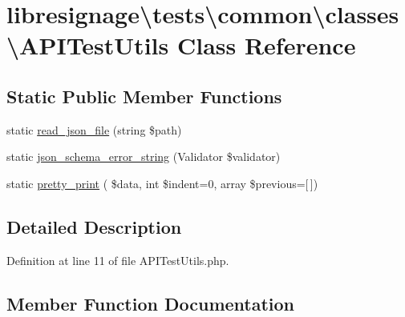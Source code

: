 \hypertarget{classlibresignage_1_1tests_1_1common_1_1classes_1_1APITestUtils}{}\section{libresignage\textbackslash{}tests\textbackslash{}common\textbackslash{}classes\textbackslash{}A\+P\+I\+Test\+Utils Class Reference}
\label{classlibresignage_1_1tests_1_1common_1_1classes_1_1APITestUtils}
\subsection*{Static Public Member Functions}
\begin{DoxyCompactItemize}
\item 
static \hyperlink{classlibresignage_1_1tests_1_1common_1_1classes_1_1APITestUtils_a59f4fce18c6b89f92f3be56ddc7ddb06}{read\+\_\+json\+\_\+file} (string \$path)
\item 
static \hyperlink{classlibresignage_1_1tests_1_1common_1_1classes_1_1APITestUtils_afdddc3567de692d1fe58f2d46e7b18bd}{json\+\_\+schema\+\_\+error\+\_\+string} (Validator \$validator)
\item 
static \hyperlink{classlibresignage_1_1tests_1_1common_1_1classes_1_1APITestUtils_af7c8423755135f0681bf406227582cbc}{pretty\+\_\+print} ( \$data, int \$indent=0, array \$previous=\mbox{[}$\,$\mbox{]})
\end{DoxyCompactItemize}


\subsection{Detailed Description}


Definition at line 11 of file A\+P\+I\+Test\+Utils.\+php.



\subsection{Member Function Documentation}
\mbox{\label{classlibresignage_1_1tests_1_1common_1_1classes_1_1APITestUtils_afdddc3567de692d1fe58f2d46e7b18bd}} 
